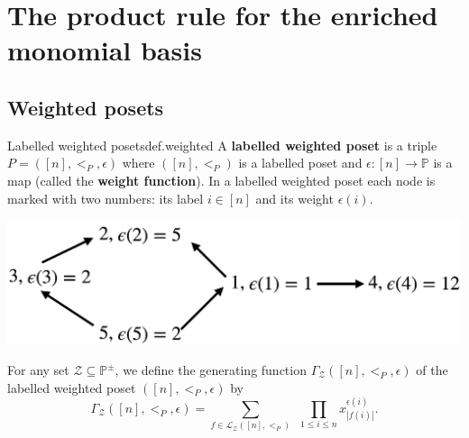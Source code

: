 \documentclass[numbers=enddot,12pt,final,onecolumn,notitlepage]{scrartcl}%
\newcommand{\PP}{\mathbb{P}} %
\newcommand{\0}{\phantom{c}}
\let\sumnonlimits\sum
\let\prodnonlimits\prod
\renewcommand{\sum}{\sumnonlimits\limits}
\renewcommand{\prod}{\prodnonlimits\limits}
\begin{document}
\section{The product rule for the enriched monomial basis}
\subsection{Weighted posets}
\begin{definition}{Labelled weighted posets}{def.weighted}
A \textbf{labelled weighted poset} is a triple $P = ([n], <_P, \epsilon)$ where $([n], <_P)$ is a labelled poset and $\epsilon : [n] \longrightarrow \PP$ is a map (called the \textbf{weight function}).
In a labelled weighted poset each node is marked with two numbers: its label $i \in [n]$ and its weight $\epsilon(i)$.
%
\begin{center}
 \includegraphics[scale=0.16]{Poset.png}
 \label{fig : poset}
 \end{center}
 For any set $\mathcal{Z}\subseteq \PP^{\pm}$, we define the generating function $\Gamma_\mathcal{Z}([n], <_P, \epsilon)$ of the labelled weighted poset $([n], <_P, \epsilon)$ by
\begin{equation}
\label{eq : weightGamma}
\Gamma_\mathcal{Z}([n], <_P, \epsilon) = \sum_{f \in \mathcal{L}_\mathcal{Z}([n], <_P)}\ \ \prod_{1\leq i \leq n}x^{\epsilon(i)}_{|f(i)|} .
\end{equation} 
 \end{definition}
 
\end{document}
